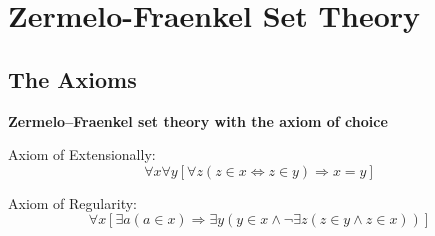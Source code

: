 
\section{Zermelo-Fraenkel Set Theory}

\subsection{The Axioms}
\begin{axiomset}
    \begin{center}
        \textbf{Zermelo--Fraenkel set theory with the axiom of choice}
    \end{center}
    \begin{axiom}
        Axiom of Extensionally:
        \begin{equation}
          \forall x \forall y [ \forall z ( z \in x \Leftrightarrow z \in y) \Rightarrow x = y ]
        \end{equation}
    \end{axiom}


    \begin{axiom}
        Axiom of Regularity:
        \begin{equation}
          \forall x [ \exists a ( a \in x ) \Rightarrow \exists y ( y \in x \land \neg \exists z ( z \in y \land z \in x ))]
        \end{equation}
    \end{axiom}


\end{axiomset}

